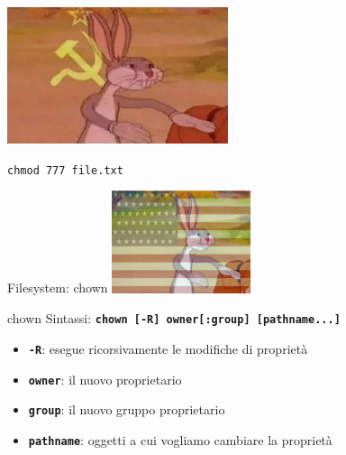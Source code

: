 \documentclass{beamer}
\begin{document}
    \begin{frame}{}
        \centering
        \includegraphics[height=4cm, keepaspectratio]{images/bugs-bunny-communist.png}
        
        \vspace{0.5cm}
        
        \Large \texttt{chmod 777 file.txt}
    \end{frame}

    \begin{frame}{Filesystem: chown}
        \centering
        \includegraphics[height=3cm, keepaspectratio]{images/bugs-bunny-capitalist.png}
        \begin{block}{chown}
            \small
            Sintassi: \texttt{\textbf{chown [-R] owner[:group] [pathname...]}}

            \begin{itemize}
                \item \texttt{\textbf{-R}}: esegue ricorsivamente le modifiche di proprietà
                \item \texttt{\textbf{owner}}: il nuovo proprietario
                \item \texttt{\textbf{group}}: il nuovo gruppo proprietario
                \item \texttt{\textbf{pathname}}: oggetti a cui vogliamo cambiare la proprietà
            \end{itemize}
        \end{block}
    \end{frame}
\end{document}
